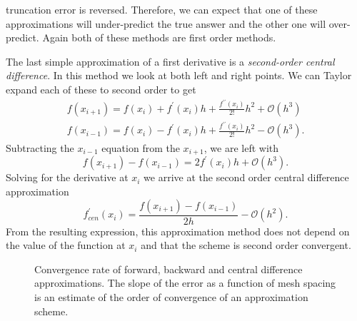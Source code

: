 truncation error is reversed. Therefore, we can expect that one of these approximations will under-predict the true answer
and the other one will over-predict. Again both of these methods are first order methods.
\par 
The last simple approximation of a first derivative is a \emph{second-order central difference}. In this method we look 
at both left and right points. We can Taylor expand each of these to second order to get
\begin{eqnarray}
    f\left(x_{i+1}\right) = f\left(x_{i}\right) + f^{\prime}\left(x_{i}\right)h + \frac{f^{\prime\prime}\left(x_{i}\right)}{2!}h^{2} + \mathcal{O}\left(h^{3}\right) \\
    f\left(x_{i-1}\right) = f\left(x_{i}\right) - f^{\prime}\left(x_{i}\right)h + \frac{f^{\prime\prime}\left(x_{i}\right)}{2!}h^{2} - \mathcal{O}\left(h^{3}\right).
\end{eqnarray}
Subtracting the $x_{i-1}$ equation from the $x_{i+1}$, we are left with
\begin{equation}
    f\left(x_{i+1}\right) - f\left(x_{i-1}\right) = 2f^{\prime}\left(x_{i}\right)h  + \mathcal{O}\left(h^{3}\right).
\end{equation}
Solving for the derivative at $x_{i}$ we arrive at the second order central difference approximation
\begin{equation}
    \boxed{f^{\prime}_{cen}\left(x_{i}\right) = \frac{f\left(x_{i+1}\right) - f\left(x_{i-1}\right)}{2h} - \mathcal{O}\left(h^{2}\right).}
\end{equation}
From the resulting expression, this approximation method does not depend on the value of the function at $x_{i}$ and that
the scheme is second order convergent.
\par
\begin{figure}[t]
\sidecaption[t]
\scalebox{0.5}{}
\caption{Convergence rate of forward, backward and central difference approximations. The slope of the error as a function of mesh spacing
is an estimate of the order of convergence of an approximation scheme.}
\label{fig:fdm_approx_1}
\end{figure}
